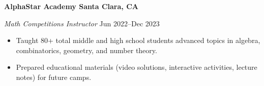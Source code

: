 \textbf{AlphaStar Academy \hfill Santa Clara, CA}\par
\textit{Math Competitions Instructor} \hfill Jun 2022--Dec 2023
\begin{itemize}
	\item Taught 80+ total middle and high school students advanced topics in algebra, combinatorics, geometry, and number theory.
	\item Prepared educational materials (video solutions, interactive activities, lecture notes) for future camps.
\end{itemize}\par